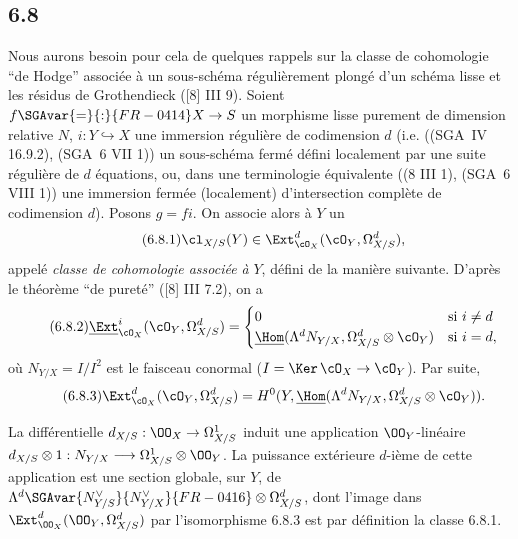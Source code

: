 \subsection*{6.8}
Nous aurons besoin pour cela de quelques rappels sur la classe de cohomologie ``de Hodge'' associée à un sous-schéma régulièrement plongé d'un schéma lisse et les résidus de Grothendieck ([8] III 9). Soient $f\SGAvar{=}{:}{FR-0414}X\to S$ un morphisme lisse purement de dimension relative $N$, $i:Y\hookrightarrow X$ une immersion régulière de codimension $d$ (i.e. ((SGA~IV 16.9.2), (SGA~6 VII 1)) un sous-schéma fermé défini localement par une suite régulière de $d$ équations, ou, dans une terminologie équivalente ((8 III 1), (SGA~6 VIII 1)) une immersion fermée (localement) d'intersection complète de codimension $d$). Posons $g=fi$. On associe alors à $Y$ un 
\begin{equation}
\tag{6.8.1}
\cl_{X/S}(Y)\in\Ext^d_{\cO_X}(\cO_Y,\Omega^d_{X/S}),
\end{equation}
appelé \emph{classe de cohomologie associée à} $Y$, défini de la manière suivante. D'après le théorème ``de pureté'' ([8] III 7.2), on a
\begin{equation}
\tag{6.8.2}
\underline{\Ext}^i_{\cO_X}(\cO_Y,\Omega^d_{X/S})=
\begin{cases}
0& \text{si } i\ne d\\
\underline{\Hom}(\Lambda^d N_{Y/X},\Omega^d_{X/S}\otimes\cO_Y)& \text{si } i=d,
\end{cases}
\end{equation}
où $N_{Y/X}=I/I^2$ est le faisceau conormal ($I=\Ker\,\cO_X\to\cO_Y$). Par suite,
\begin{equation}
\tag{6.8.3}
\Ext^d_{\cO_X}(\cO_Y,\Omega^d_{X/S})=H^0(Y,\underline{\Hom}(\Lambda^dN_{Y/X},\Omega^d_{X/S}\otimes\cO_Y)).
\end{equation}

La différentielle $d_{X/S}:\OO_X\to\Omega^1_{X/S}$ induit une application $\OO_Y$-linéaire $d_{X/S}\otimes 1:N_{Y/X}\longrightarrow \Omega^1_{X/S}\otimes\OO_Y$. La puissance extérieure $d$-ième de cette application est une section globale, sur $Y$, de $\Lambda^d \SGAvar{N_{Y/S}^{\vee}}{N_{Y/X}^{\vee}}{FR-0416}\otimes\Omega^d_{X/S}$, dont l'image dans $\Ext^d_{\OO_X}(\OO_Y,\Omega^d_{X/S})$ par l'isomorphisme 6.8.3 est par définition la classe 6.8.1.

